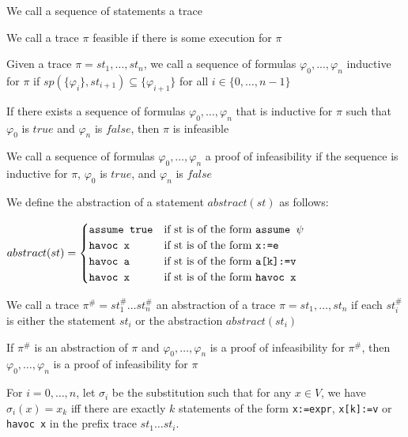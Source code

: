 \documentclass[landscape, a4paper]{article}
\begin{document}
\begin{minipage}[t]{0.2\linewidth}
\begin{betterlist}
		\item \color{orange}We call a sequence of statements a \alert{trace}\color{black}
		\begin{betterlist}
			\item We call a trace $\pi$ \alert{feasible} if there is some execution for $\pi$
		\end{betterlist}
		\item \color{orange}Given a trace $\pi = st_1, \ldots, st_n$, we call a \alert{sequence of formulas} $\varphi_0, . . . , \varphi_n$ \alert{inductive for $\pi$} if $sp(\{\varphi_i\}, st_{i+1}) \subseteq \{\varphi_{i+1}\}$ for all $i \in \{0, \ldots, n−1\}$\color{black} %
		\item If there exists a sequence of formulas $\varphi_0, \ldots , \varphi_n$ that is inductive for $\pi$ such that $\varphi_0$ is $true$ and $\varphi_n$ is $false$, then $\pi$ is infeasible
		\item \color{orange}We call a sequence of formulas $\varphi_0, \ldots , \varphi_n$ a \alert{proof of infeasibility} if the sequence is inductive for $\pi$, $\varphi_0$ is $true$, and $\varphi_n$ is $false$\color{black}
		\item We define the \alert{abstraction of a statement} $abstract(st)$ as follows:

		$abstract(st) = \begin{cases}
				\verb|assume true| & \text{if st is of the form } \verb|assume |\psi \\
				\verb|havoc x|     & \text{if st is of the form } \verb|x:=e|        \\
				\verb|havoc a|     & \text{if st is of the form } \verb|a[k]:=v|     \\
				\verb|havoc x|     & \text{if st is of the form } \verb|havoc x|
			\end{cases}$
		\item We call a trace $\pi^\# = st^\#_1 \ldots st^\#_n$ an \alert{abstraction of a trace} $\pi = st_1, \ldots, st_n$ if each $st^\#_i$ is either the statement $st_i$ or the abstraction $abstract(st_i)$
		\begin{betterlist}
			\item If $\pi^\#$ is an abstraction of $\pi$ and $\varphi_0, \ldots , \varphi_n$ is a proof of infeasibility for $\pi^\#$, then $\varphi_0, \ldots , \varphi_n$ is a proof of infeasibility for $\pi$
		\end{betterlist}
		\item For $i = 0, \ldots, n$, let $\sigma_i$ be the substitution such that for any $x \in V$, we have $\sigma_i(x) = x_k$ iff there are exactly $k$ statements of the form \verb|x:=expr|, \verb|x[k]:=v| or \verb|havoc x| in the prefix trace $st_1 \ldots st_i$.


\end{betterlist}
\end{minipage}
\end{document}
